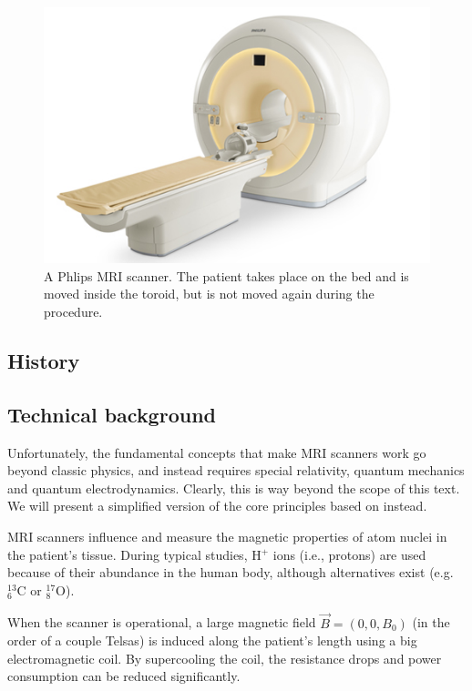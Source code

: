 \begin{figure}[ht]
\begin{center}
  \includegraphics[width=\linewidth]{img/mriscanner.jpg}
  \caption{A Phlips MRI scanner. The patient takes place on the bed and is
  moved inside the toroid, but is not moved again during the procedure.}
  \label{fig:mriscanner}
\end{center}
\end{figure}

\subsection{History}

\subsection{Technical background}
Unfortunately, the fundamental concepts that make MRI scanners work go beyond
classic physics, and instead requires special relativity, quantum mechanics and
quantum electrodynamics. Clearly, this is way beyond the scope of this text. We
will present a simplified version of the core principles based on
\cite{suetens} instead.

MRI scanners influence and measure the magnetic properties of atom nuclei in the
patient's tissue. During typical studies, H$^+$ ions (i.e., protons) are used
because of their abundance in the human body, although alternatives exist
(e.g. ${}^{13}_6$C or ${}^{17}_8$O).

When the scanner is operational, a large magnetic field $\vec{B} = (0,0,B_0)$
(in the order of a couple Telsas) is induced along the patient's length using a
big electromagnetic coil. By supercooling the coil, the resistance drops and
power consumption can be reduced significantly.

